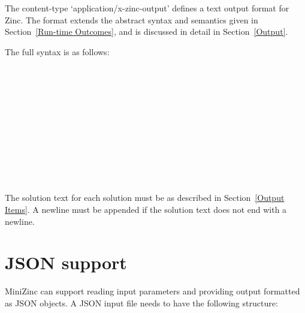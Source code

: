 \documentclass[10pt]{scrartcl}
\begin{document}
The content-type `application/x-zinc-output' defines
a text output format for Zinc.
The format extends the abstract syntax and semantics
given in Section~\ref{Run-time Outcomes},
and is discussed in detail in Section~\ref{Output}.

The full syntax is as follows:

\begin{productions}
\RuleOutput \\
\\
\RuleSolution \\
\\
\RuleOutcomeStrings \\
\\
\RuleComplete \\
\\
\RuleWarnings \\
\\
\RuleMessage
\end{productions}

\noindent
The solution text for each solution must be
as described in Section~\ref{Output Items}.
A newline must be appended if the solution text does not end with a newline.


\clearpage
\section{JSON support}
  \label{json}

MiniZinc can support reading input parameters and providing output formatted
as JSON objects. A JSON input file needs to have the following structure:
\end{document}
